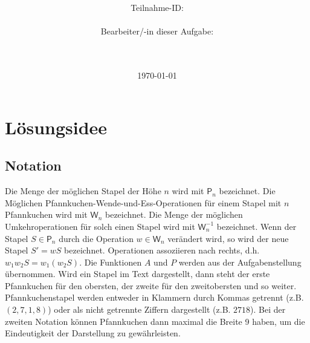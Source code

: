 \documentclass[a4paper,10pt,ngerman]{scrartcl}
\title{\textbf{\Huge\Aufgabe}}
\author{\LARGE Teilnahme-ID: \LARGE \TeilnahmeId \\\\
  \LARGE Bearbeiter/-in dieser Aufgabe: \\
  \LARGE \Name\\\\}
\date{\LARGE\today}
\begin{document}
\maketitle
\tableofcontents

\vspace{0.5cm}

\section{Lösungsidee}
\subsection{Notation}
Die Menge der möglichen Stapel der Höhe $n$ wird mit $\mathsf{P}_n$ bezeichnet.
Die Möglichen Pfannkuchen-Wende-und-Ess-Operationen für einem Stapel mit $n$
Pfannkuchen wird mit $\mathsf{W}_n$ bezeichnet. Die Menge der möglichen
Umkehroperationen für solch einen Stapel wird mit $\mathsf{W}^{-1}_n$
bezeichnet. Wenn der Stapel $S \in \mathsf{P}_n$ durch die Operation $w \in
  \mathsf{W}_n$ verändert wird, so wird der neue Stapel $S' = w S$ bezeichnet.
Operationen assoziieren nach rechts, d.h. $w_1 w_2 S = w_1 (w_2 S)$. Die
Funktionen $A$ und $P$ werden aus der Aufgabenstellung übernommen. Wird ein
Stapel im Text dargestellt, dann steht der erste Pfannkuchen für den obersten,
der zweite für den zweitobersten und so weiter. Pfannkuchenstapel werden
entweder in Klammern durch Kommas getrennt (z.B. $(2,7,1,8)$) oder als nicht
getrennte Ziffern dargestellt (z.B. $2718$). Bei der zweiten Notation können
Pfannkuchen dann maximal die Breite 9 haben, um die Eindeutigkeit der
Darstellung zu gewährleisten.
\end{document}
